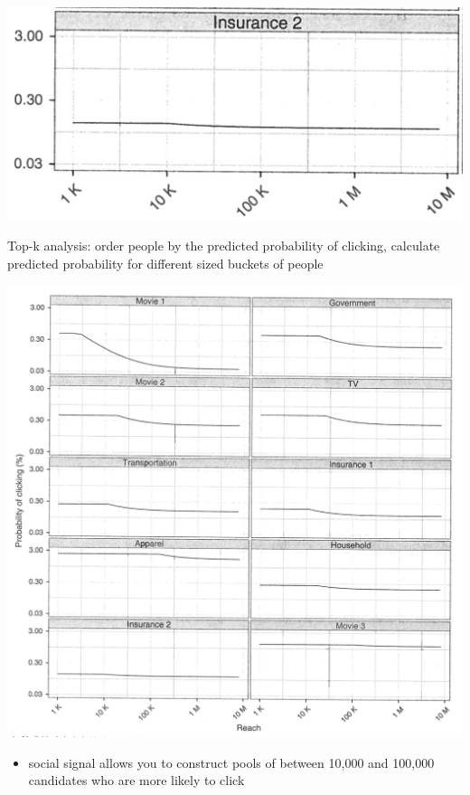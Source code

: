\documentclass[aspectratio=169]{beamer}
\begin{document}
\begin{frame}

\begin{center}
\includegraphics[width=\textwidth]{figures/goel_predicting_2014_fig1_insurance1}
\end{center}

\vfill
Top-k analysis: order people by the predicted probability of clicking, calculate predicted probability for different sized buckets of people

\end{frame}
\begin{frame}

\begin{center}
\includegraphics[height=0.8\textheight]{figures/goel_predicting_2014_fig1}
\end{center}

\vfill

\begin{itemize}
\item social signal allows you to construct pools of between 10,000 and 100,000 candidates who are more likely to click
\end{itemize}

\end{frame}
\end{document}
